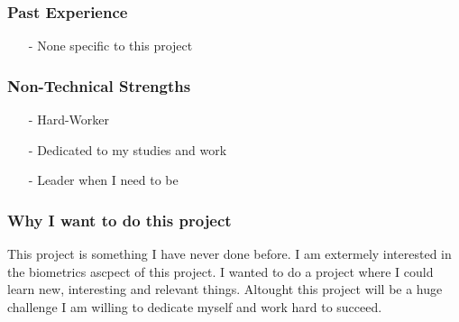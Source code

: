 \subsubsection{Past Experience} 
\begin{itemize}
	\item[-]{None specific to this project}
\end{itemize}
\subsubsection{Non-Technical Strengths}
\begin{itemize}
	\item[-]{Hard-Worker}
	\item[-]{Dedicated to my studies and work}
	\item[-]{Leader when I need to be}
\end{itemize}
\subsubsection{Why I want to do this project}
This project is something I have never done before. I am extermely interested in the biometrics ascpect of this project. I wanted to do a project where I could learn new, interesting and relevant things. Altought this project will be a huge challenge I am willing to dedicate myself and work hard to succeed. 
